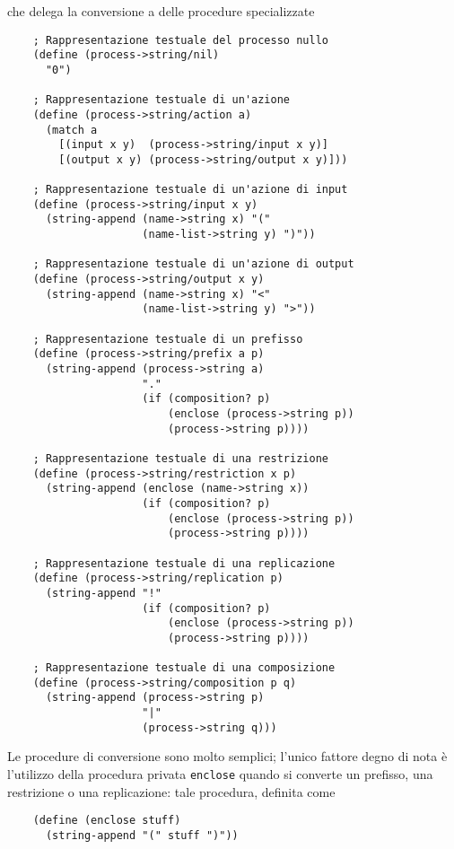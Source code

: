 che delega la conversione a delle procedure specializzate

\begin{lstlisting}
    ; Rappresentazione testuale del processo nullo
    (define (process->string/nil)
      "0")

    ; Rappresentazione testuale di un'azione
    (define (process->string/action a)
      (match a
        [(input x y)  (process->string/input x y)]
        [(output x y) (process->string/output x y)]))

    ; Rappresentazione testuale di un'azione di input
    (define (process->string/input x y)
      (string-append (name->string x) "("
                     (name-list->string y) ")"))

    ; Rappresentazione testuale di un'azione di output
    (define (process->string/output x y)
      (string-append (name->string x) "<"
                     (name-list->string y) ">"))

    ; Rappresentazione testuale di un prefisso
    (define (process->string/prefix a p)
      (string-append (process->string a)
                     "."
                     (if (composition? p)
                         (enclose (process->string p))
                         (process->string p))))

    ; Rappresentazione testuale di una restrizione
    (define (process->string/restriction x p)
      (string-append (enclose (name->string x))
                     (if (composition? p)
                         (enclose (process->string p))
                         (process->string p))))

    ; Rappresentazione testuale di una replicazione
    (define (process->string/replication p)
      (string-append "!"
                     (if (composition? p)
                         (enclose (process->string p))
                         (process->string p))))

    ; Rappresentazione testuale di una composizione
    (define (process->string/composition p q)
      (string-append (process->string p)
                     "|"
                     (process->string q)))
\end{lstlisting}

Le procedure di conversione sono molto semplici; l'unico fattore degno
di nota \`e l'utilizzo della procedura privata \lstinline{enclose} quando
si converte un prefisso, una restrizione o una replicazione: tale
procedura, definita come

\begin{lstlisting}
    (define (enclose stuff)
      (string-append "(" stuff ")"))
\end{lstlisting}

